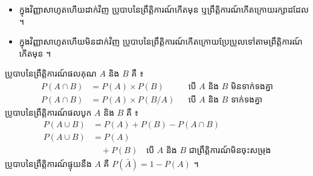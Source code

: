 \begin{note}[សម្គាល់]
\begin{itemize}
  \item ក្នុងវិញ្ញាសាហូតហើយដាក់វិញ ប្រូបាបនៃព្រឹត្តិការណ៍កើតមុន ឬព្រឹត្តិការណ៍កើតក្រោយរក្សាដដែល ។
  \item ក្នុងវិញ្ញាសាហូតហើយមិនដាក់វិញ ប្រូបាបនៃព្រឹត្តិការណ៍កើតក្រោយប្រែប្រួលទៅតាមព្រឹត្តិការណ៍កើតមុន ។
\end{itemize}
\end{note}

\begin{theorem}[សន្និដ្ឋាន]
ប្រូបាបនៃព្រឹត្តិការណ៍ផលគុណ $A$ និង $B$ គឺ ៖
\[
\begin{aligned}
P(A \cap B) &= P(A)\times P(B) && \text{បើ } A \text{ និង } B \text{ មិនទាក់ទងគ្នា}\\
P(A \cap B) &= P(A)\times P(B/A) && \text{បើ } A \text{ និង } B \text{ ទាក់ទងគ្នា}
\end{aligned}
\]
ប្រូបាបនៃព្រឹត្តិការណ៍ផលបូក $A$ និង $B$ គឺ ៖
\[
\begin{aligned}
P(A \cup B) &= P(A) + P(B) - P(A \cap B)\\
P(A \cup B) &= P(A)\\
&\quad + P(B) \quad \text{បើ } A \text{ និង } B \text{ ជាព្រឹត្តិការណ៍មិនចុះសម្រុង}
\end{aligned}
\]
ប្រូបាបនៃព្រឹត្តិការណ៍ផ្ទុយនឹង $A$ គឺ $P(\bar{A}) = 1 - P(A)$ ។
\end{theorem}

